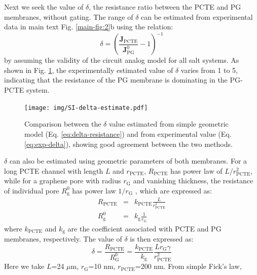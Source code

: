 \documentclass[manuscript=suppinfo,email=true, hyperref=true, keywords=false]{achemso}
\newcommand{\Fig}{Fig.}
\begin{document}
Next we seek the value of $\delta$, the resistance ratio
between the PCTE and PG membranes, without gating. The range
of $\delta$ can be estimated from experimental data in main text
\Fig{} \ref{main-fig:2}b using the relation:
\begin{equation}
  \label{eq:exp-delta}
  \delta = \left(\frac{\boldsymbol{J}_{\mathrm{PCTE}}}{\boldsymbol{J}_{\mathrm{PG}}^{0}} -1 \right)^{-1}
\end{equation}
by assuming the validity of the circuit analog model for all salt
systems. As shown in \Fig{} \ref{fig:delta-compare}, the
experimentally estimated value of $\delta$ varies from 1 to 5,
indicating that the resistance of the PG membrane is dominating in the
PG-PCTE system.
\begin{figure}[htbp]
  \centering
  \texttt{[image: img/SI-delta-estimate.pdf]}
  \caption{Comparison between the $\delta$ value estimated from simple
    geometric model (Eq. \ref{eq:delta-resistance}) and from
    experimental value (Eq. \ref{eq:exp-delta}), showing good
    agreement between the two methods.  }
  \label{fig:delta-compare}
\end{figure}
$\delta$ can also be estimated using geometric parameters of both
membranes. For a long PCTE channel with length $L$ and
$r_{\mathrm{PCTE}}$, $R_{\mathrm{PCTE}}$ has power law of
$L/r_{\mathrm{PCTE}}^{2}$, while for a graphene pore
with radius $r_{\mathrm{G}}$ and vanishing thickness, the resistance of individual pore $R_{\mathrm{g}}^{0}$
has power law $1/r_{\mathrm{G}}$ \cite{O_Hern_2014}, which are expressed as:
\begin{subequations}
\begin{eqnarray}
  \label{eq:R-both}
  R_{\mathrm{PCTE}} &= &k_{\mathrm{PCTE}} \frac{L}{r_{\mathrm{PCTE}}^{2}} \\
  R_{\mathrm{g}}^{0} &= &k_{\mathrm{g}} \frac{1}{r_{\mathrm{G}}}
\end{eqnarray}
\end{subequations}
where $k_{\mathrm{PCTE}}$ and $k_{\mathrm{g}}$ are the coefficient
associated with PCTE and PG membranes, respectively. The value of
$\delta$ is then expressed as:
\begin{equation}
  \label{eq:delta-resistance}
  \delta
  = \frac{R_{\mathrm{PCTE}}}{R_{\mathrm{G}}^{0}}
  = {\displaystyle
    \frac{k_{\mathrm{PCTE}}}{k_{\mathrm{g}}}
    \frac{L r_{\mathrm{G}} \gamma}
        {r_{\mathrm{PCTE}}^{2}}}
\end{equation}
Here we take $L$=24 $\mu$m, $r_{\mathrm{G}}$=10 nm,
$r_{\mathrm{PCTE}}$=200 nm. From simple Fick's law\cite{Beers_2006},
\end{document}
